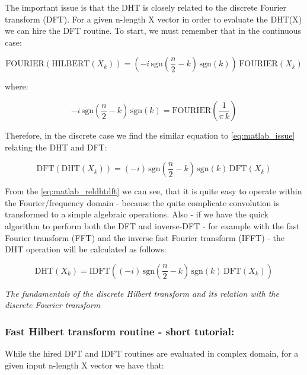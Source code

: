 \documentclass[12pt,twoside,a4paper]{article}
\numberwithin{equation}{subsection}
\numberwithin{figure}{subsection}
\begin{document}
The important issue is that the DHT is closely related to the discrete Fourier transform (DFT). For a given n-length X vector in
order to evaluate the DHT(X) we can hire the DFT routine. To start, we must remember that in the continuous case:

\begin{equation} \label{eq:matlab_issue}
  \mathrm{FOURIER}(\mathrm{HILBERT}({X_{k}}))=( - i\,\mathrm{sgn}( \frac {n}{2} - k)\,\mathrm{sgn}(k))\,\mathrm{FOURIER}({X_{k}})
\end{equation}

where:

\begin{equation} \label{eq:matlab_kernel}
   - i\,\mathrm{sgn}(\frac {n}{2} - k)\,\mathrm{sgn}(k)=\mathrm{FOURIER}(\frac {1}{\pi \,k})
\end{equation}

Therefore, in the discrete case we find the similar equation to \ref{eq:matlab_issue} relating the DHT and DFT:

\begin{equation} \label{eq:matlab_reldhtdft}
  \mathrm{DFT}(\mathrm{DHT}({X_{k}}))=( - i)\,\mathrm{sgn}(\frac {n}{2} - k)\,\mathrm{sgn}(k)\,\mathrm{DFT}({X_{k}})
\end{equation}

From the \ref{eq:matlab_reldhtdft} we can see, that it is quite easy to operate within the Fourier/frequency domain - because the
quite complicate convolution is transformed to a simple algebraic operations. Also - if we have the quick algorithm to perform both
the DFT and inverse-DFT - for example with the fast Fourier transform (FFT) and the inverse fast Fourier transform (IFFT) - the DHT
operation will be calculated as follows:

\begin{equation} \label{eq:matlab_fulldhthdf}
  \mathrm{DHT}({X_{k}})=\mathrm{IDFT}(( - i)\,\mathrm{sgn}(\frac {n}{2} - k)\,\mathrm{sgn}(k)\,\mathrm{DFT}({X_{k}}))
\end{equation}

\textit{The fundamentals of the discrete Hilbert transform and its relation with the discrete Fourier transform}

\subsubsection*{Fast Hilbert transform routine - short tutorial:}

While the hired DFT and IDFT routines are evaluated in complex domain, for a given input n-length X vector we have that:
\end{document}
